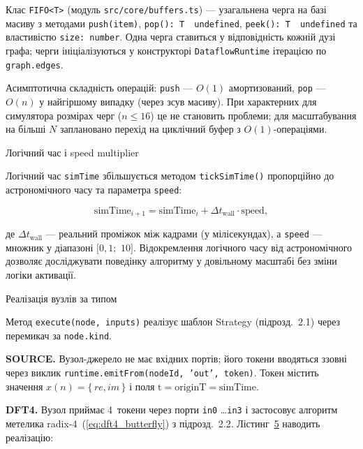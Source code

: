 Клас \texttt{FIFO\textless{}T\textgreater{}} (модуль
\texttt{src/core/buffers.ts}) --- узагальнена черга на базі масиву з
методами \texttt{push(item)}, \texttt{pop():\ T\ \textbar{}\ undefined},
\texttt{peek():\ T\ \textbar{}\ undefined} та властивістю
\texttt{size:\ number}. Одна черга ставиться у відповідність кожній дузі
графа; черги ініціалізуються у конструкторі \texttt{DataflowRuntime}
ітерацією по \texttt{graph.edges}.

Асимптотична складність операцій: \texttt{push} --- \(O(1)\)
амортизований, \texttt{pop} --- \(O(n)\) у найгіршому випадку (через
зсув масиву). При характерних для симулятора розмірах черг
(\(n \leq 16\)) це не становить проблеми; для масштабування на більші
\(N\) заплановано перехід на циклічний буфер з \(O(1)\)-операціями.

Логічний час і speed multiplier

Логічний час \texttt{simTime} збільшується методом
\texttt{tickSimTime()} пропорційно до астрономічного часу та параметра
\texttt{speed}:

\[\text{simTime}_{i + 1} = \text{simTime}_{i} + \Delta t_{\text{wall}} \cdot \text{speed},\]

де \(\Delta t_{\text{wall}}\) --- реальний проміжок між кадрами (у
мілісекундах), а \texttt{speed} --- множник у діапазоні
\(\lbrack 0,1;\mspace{6mu} 10\rbrack\). Відокремлення логічного часу від
астрономічного дозволяє досліджувати поведінку алгоритму у довільному
масштабі без зміни логіки активації.

Реалізація вузлів за типом

Метод \texttt{execute(node,\ inputs)} реалізує шаблон Strategy
(підрозд.~2.1) через перемикач за \texttt{node.kind}.

\textbf{SOURCE.} Вузол-джерело не має вхідних портів; його токени
вводяться ззовні через виклик
\texttt{runtime.emitFrom(nodeId,\ ’out’,\ token)}. Токен містить
значення \(x(n) = \{\, re,im\,\}\) і поля
\(\text{t} = \text{originT} = \text{simTime}\).

\textbf{DFT4.} Вузол приймає 4~токени через порти \texttt{in0}
\ldots{}\texttt{in3} і застосовує алгоритм метелика
radix-4~(\hyperref[eq:dft4_butterfly]{{[}eq:dft4\_butterfly{]}}) з
підрозд.~2.2. Лістинг~\hyperref[lst:dft4]{5} наводить реалізацію:

